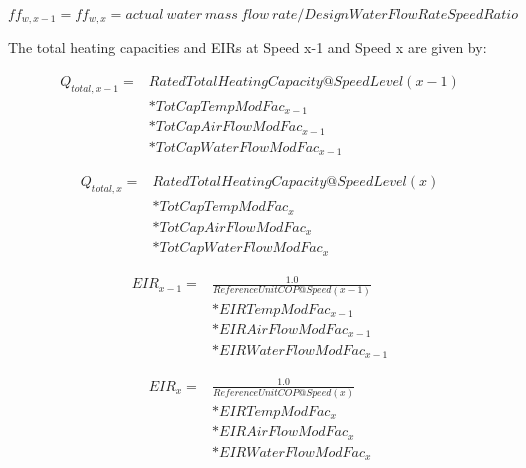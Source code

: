 \begin{equation}
ff_{w,x-1} = ff_{w,x} = actual~water~mass~flow~rate/DesignWaterFlowRateSpeedRatio
\end{equation}

The total heating capacities and EIRs at Speed x-1 and Speed x are given by:

\begin{equation}
  \begin{array}{rl}
    Q_{total,x - 1} =& RatedTotalHeatingCapacity@SpeedLevel\left( {x - 1} \right) \\
                    &* TotCapTempModFac_{x - 1} \\
                    &* TotCapAirFlowModFac_{x - 1} \\
                    &* TotCapWaterFlowModFac_{x - 1}
  \end{array}
\end{equation}

\begin{equation}
  \begin{array}{rl}
    Q_{total,x} =& RatedTotalHeatingCapacity@SpeedLevel\left( x \right) \\
                &* TotCapTempModFac_x \\
                &* TotCapAirFlowModFac_x \\
                &* TotCapWaterFlowModFac_x
 \end{array}
\end{equation}

\begin{equation}
  \begin{array}{rl}
    EIR_{x - 1} =& \frac{1.0}{ReferenceUnitCOP@Speed(x - 1)} \\
                &* EIRTempModFac_{x - 1} \\
                &* EIRAirFlowModFac_{x - 1} \\
                &* EIRWaterFlowModFac_{x - 1}
  \end{array}
\end{equation}

\begin{equation}
  \begin{array}{rl}
    EIR_x =& \frac{1.0}{ReferenceUnitCOP@Speed(x)} \\
                &* EIRTempModFac_{x} \\
                &* EIRAirFlowModFac_{x} \\
                &* EIRWaterFlowModFac_{x}
  \end{array}
\end{equation}

